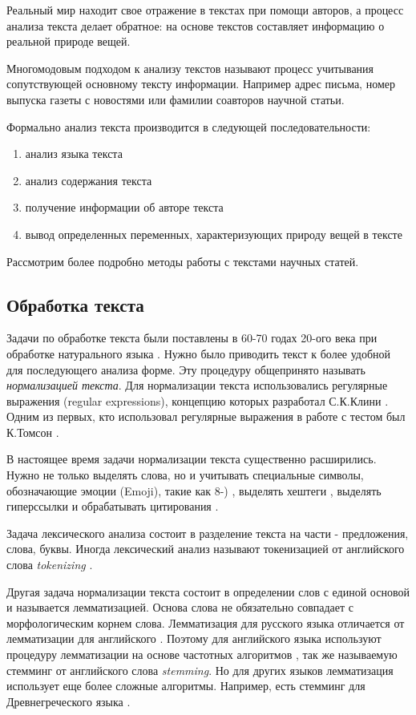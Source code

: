 Реальный мир находит свое отражение в текстах при помощи авторов, а процесс анализа текста делает обратное: на основе текстов составляет информацию о реальной природе вещей. 

Многомодовым подходом к анализу текстов называют процесс учитывания сопутствующей основному тексту информации. Например адрес письма, номер выпуска газеты с новостями или фамилии соавторов научной статьи. 

Формально анализ текста производится в следующей последовательности: 
\begin{enumerate}
\tightlist
\item анализ языка текста
\item анализ содержания текста
\item получение информации об авторе текста
\item вывод определенных переменных, характеризующих природу вещей в тексте
\end{enumerate}

Рассмотрим более подробно методы работы с текстами научных статей.

\subsection{Обработка текста}
Задачи по обработке текста были поставлены в 60-70 годах 20-ого века при обработке натурального языка \cite{weizenbaum1966eliza, kuvcera1967computational}.
Нужно было приводить текст к более удобной для последующего анализа форме. Эту процедуру общепринято называть \textit{нормализацией текста}. Для нормализации текста  использовались регулярные выражения (regular expressions), концепцию которых разработал С.К.Клини \cite{kleene1951representation}. Одним из первых, кто использовал регулярные выражения в работе с тестом был К.Томсон \cite{thompson1968programming}.

В настоящее время задачи нормализации текста существенно расширились. Нужно не только выделять слова, но и учитывать специальные символы, обозначающие эмоции (Emoji), такие как 8-) \cite{eisner2016emoji2vec}, выделять хештеги \cite{o2010tweets},  выделять гиперссылки \cite{bingel2017identifying} и обрабатывать цитирования \cite{jha2017nlp}.
	
Задача лексического анализа состоит в разделение текста на части - предложения, слова, буквы.  Иногда лексический анализ называют токенизацией от английского слова \textit{tokenizing} \cite{lovins1968development}.

Другая задача нормализации текста состоит в определении слов с единой основой и называется лемматизацией. Основа слова не обязательно совпадает с морфологическим корнем слова. 
Лемматизация для русского языка отличается от лемматизации для английского \cite{segalovich2003fast, sharoff2011proper, korobov2015morphological}. Поэтому для английского языка используют процедуру лемматизации на основе частотных алгоритмов \cite{willett2006porter, porter2001snowball}, так же называемую стемминг от английского слова \textit{stemming}. Но для других языков лемматизация использует еще более сложные алгоритмы. Например, есть стемминг для Древнегреческого языка \cite{packard1973computer}.

